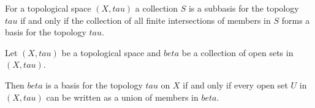 \begin{note}
    For a topological space $(X, tau)$ a collection $S$ is a subbasis for the topology $tau$ if and only if the collection of all finite intersections of members in $S$ forms a basis for the topology $tau$.
\end{note}

\begin{thm}
    Let $(X, tau)$ be a topological space and $beta$ be a collection of open sets in $(X, tau)$.

    Then $beta$ is a basis for the topology $tau$ on $X$ if and only if every open set $U$ in $(X, tau)$ can be written as a union of members in $beta$.
\end{thm}
